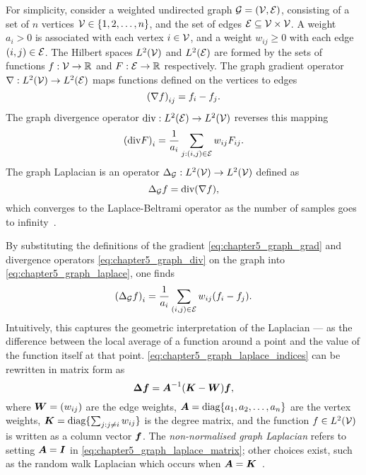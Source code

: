 For simplicity, consider a weighted undirected graph \(\mathcal{G} = (\mathcal{V}, \mathcal{E})\), consisting of a set of \(n\) vertices \(\mathcal{V} \in \{1,2,\ldots,n\}\), and the set of edges \(\mathcal{E} \subseteq \mathcal{V} \times \mathcal{V}{}\).
A weight \(a_{i} > 0\) is associated with each vertex \(i \in \mathcal{V}{}\), and a weight \(w_{i j} \geq 0\) with each edge \((i,j) \in \mathcal{E}{}\).
The Hilbert spaces \(L^{2}(\mathcal{V})\) and \(L^{2}(\mathcal{E})\) are formed by the sets of functions \(f: \mathcal{V} \to \mathbb{R}\) and \(F: \mathcal{E} \to \mathbb{R}\) respectively.
The graph gradient operator \(\nabla: L^{2}(\mathcal{V}) \to L^{2}(\mathcal{E})\) maps functions defined on the vertices to edges
%
\begin{equation}\label{eq:chapter5_graph_grad}
	{(\nabla f)}_{i j}
	= f_{i} - f_{j}.
\end{equation}
%
The graph divergence operator \(\text{div}: L^{2}(\mathcal{E}) \to L^{2}(\mathcal{V})\) reverses this mapping
%
\begin{equation}\label{eq:chapter5_graph_div}
	{(\text{div}F)}_{i}
	= \frac{1}{a_{i}} \sum\limits_{j : (i,j) \in \mathcal{E}} w_{i j} F_{i j}.
\end{equation}
%
The graph Laplacian is an operator \(\Delta_{\mathcal{G}} : L^{2}(\mathcal{V}) \to L^{2}(\mathcal{V})\) defined as
%
\begin{equation}\label{eq:chapter5_graph_laplace}
	\Delta_{\mathcal{G}} f
	= \text{div}(\nabla f),
\end{equation}
%
which converges to the Laplace-Beltrami operator as the number of samples goes to infinity~\cite{Belkin2007}.

By substituting the definitions of the gradient \cref{eq:chapter5_graph_grad} and divergence operators \cref{eq:chapter5_graph_div} on the graph into \cref{eq:chapter5_graph_laplace}, one finds
%
\begin{equation}\label{eq:chapter5_graph_laplace_indices}
	{(\Delta_{\mathcal{G}} f)}_{i}
	= \frac{1}{a_{i}} \sum\limits_{(i,j) \in \mathcal{E}} w_{i j} (f_{i} - f_{j}).
\end{equation}
%
Intuitively, this captures the geometric interpretation of the Laplacian --- as the difference between the local average of a function around a point and the value of the function itself at that point.
\cref{eq:chapter5_graph_laplace_indices} can be rewritten in matrix form as
%
\begin{equation}\label{eq:chapter5_graph_laplace_matrix}
	\vb*{\Delta} \vb*{f}
	= \vb*{A}^{-1} (\vb*{K} - \vb*{W}) \vb*{f},
\end{equation}
%
where \(\vb*{W} = (w_{i j})\) are the edge weights, \(\vb*{A} = \text{diag}\{a_{1},a_{2},\ldots,a_{n}\}\) are the vertex weights, \(\vb*{K} = \text{diag}\{\sum_{j: j \neq i} w_{i j}\}\) is the degree matrix, and the function \(f \in L^{2}(\mathcal{V})\) is written as a column vector \(\vb*{f}\).
The \emph{non-normalised graph Laplacian} refers to setting \(\vb*{A} = \vb*{I}\) in \cref{eq:chapter5_graph_laplace_matrix}; other choices exist, such as the random walk Laplacian which occurs when \(\vb*{A} = \vb*{K}\)~\cite{VonLuxburg2007}.

